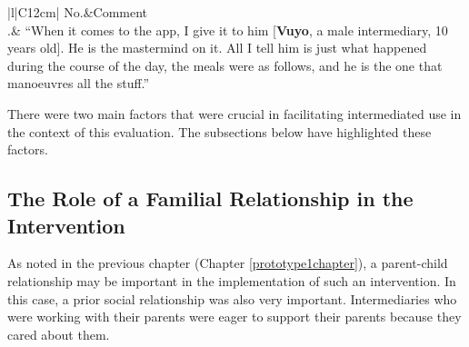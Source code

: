 \begin{table}[h!]
\renewcommand{\baselinestretch}{1.5}
  \begin{center}
    \caption{Excerpt: an example of how intermediaries trusted as experts by beneficiaries.}
    \label{table:skilledintermediaries}
	\begin{tabular}{|l|C{12cm}|}
		\hline
		No.&Comment\\
		.& {``When it comes to the app, I give it to him [\textbf{Vuyo}, a male intermediary, 10 years old]. He is the mastermind on it. All I tell him is just what happened during the course of the day, the meals were as follows, and he is the one that manoeuvres all the stuff.''} \\
		\hline
	\end{tabular}
  \end{center}
\end{table} 

There were two main factors that were crucial in facilitating intermediated use in the context of this evaluation. The subsections below have highlighted these factors.

\subsection{The Role of a Familial Relationship in the Intervention}
As noted in the previous chapter (Chapter \ref{prototype1chapter}), a parent-child relationship may be important in the implementation of such an intervention. In this case, a prior social relationship was also very important. Intermediaries who were working with their parents were eager to support their parents because they cared about them. 

